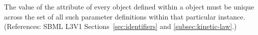 The value of the attribute  of every \LocalParameter object
defined within a \KineticLaw object must be unique across the set of all
such parameter definitions within that particular \KineticLaw instance.
(References: SBML L3V1 Sections~\ref{sec:identifiers} and
\ref{subsec:kinetic-law}.)
